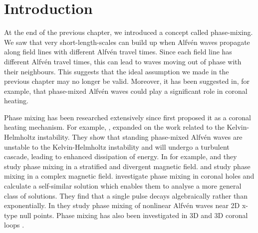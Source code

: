 \section{Introduction}
\label{sec:chap_3_introduction}

At the end of the previous chapter, we introduced a concept called phase-mixing. We saw that very short-length-scales can build up when Alfv\'en waves propagate along field lines with different Alfv\'en travel times. Since each field line has different Alfv\'en travel times, this can lead to waves moving out of phase with their neighbours. This suggests that the ideal assumption we made in the previous chapter may no longer be valid. Moreover, it has been suggested in, for example, \citet{Heyvaerts1983} that phase-mixed Alfv\'en waves could play a significant role in coronal heating.

Phase mixing has been researched extensively since \citet{Heyvaerts1983} first proposed it as a coronal heating mechanism. For example, \citet{Browning1984}, expanded on the \citet{Heyvaerts1983} work related to the Kelvin-Helmholtz instability. They show that standing phase-mixed Alfv\'en waves are unstable to the Kelvin-Helmholtz instability and will undergo a turbulent cascade, leading to enhanced dissipation of energy. In for example, \citet{DeMoortel2002} and \citet{Smith2007} they study phase mixing in a stratified and divergent magnetic field. \citet{Similon1989} and \citet{Howson2019} study phase mixing in a complex magnetic field. \citet{Hood1997,Hood2002} investigate phase mixing in coronal holes and calculate a self-similar solution which enables them to analyse a more general class of solutions. They find that a single pulse decays algebraically rather than exponentially. In \citet{McLaughlin2011a,McLaughlin2013,Prokopyszyn2019a} they study phase mixing of nonlinear Alfv\'en waves near 2D x-type null points. Phase mixing has also been investigated in 3D \citep{Magyar2017} and 3D coronal loops \citep{Pagano2017,Pagano2018}.

